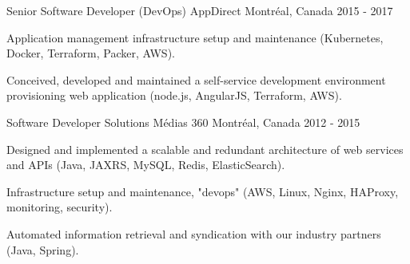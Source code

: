 \begin{cventries}
  \cventry
    {Senior Software Developer (DevOps)} %
    {AppDirect} %
    {Montréal, Canada} %
    {2015 - 2017} %
    {
      \begin{cvitems} %
        \item {Application management infrastructure setup and maintenance (Kubernetes, Docker, Terraform, Packer, AWS).}
        \item {Conceived, developed and maintained a self-service development environment provisioning web application (node.js, AngularJS, Terraform, AWS).}
      \end{cvitems}
    }

  \cventry
    {Software Developer} %
    {Solutions Médias 360} %
    {Montréal, Canada} %
    {2012 - 2015} %
    {
      \begin{cvitems} %
        \item {Designed and implemented a scalable and redundant architecture of web services and APIs (Java, JAXRS, MySQL, Redis, ElasticSearch).}
        \item {Infrastructure setup and maintenance, "devops" (AWS, Linux, Nginx, HAProxy, monitoring, security).}
        \item {Automated information retrieval and syndication with our industry partners (Java, Spring).}
      \end{cvitems}
    }



\end{cventries}
